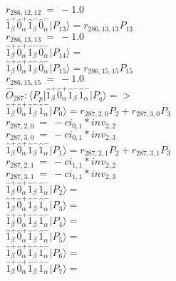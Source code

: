 \documentclass[14pt]{article}
\begin{document}
    ${r}_{286,12,12}\ =\ -1.0 $ \\ 
    $ \hat{1}_{\beta}^{+}\hat{0}_{\alpha}^{+}\hat{1}_{\beta}^{-}\hat{0}_{\alpha}^{-} \vert{P_{13}}\rangle = {r}_{286,13,13}P_{13} $ \\ 
    ${r}_{286,13,13}\ =\ -1.0 $ \\ 
    $ \hat{1}_{\beta}^{+}\hat{0}_{\alpha}^{+}\hat{1}_{\beta}^{-}\hat{0}_{\alpha}^{-} \vert{P_{14}}\rangle =  $ \\ 
    $ \hat{1}_{\beta}^{+}\hat{0}_{\alpha}^{+}\hat{1}_{\beta}^{-}\hat{0}_{\alpha}^{-} \vert{P_{15}}\rangle = {r}_{286,15,15}P_{15} $ \\ 
    ${r}_{286,15,15}\ =\ -1.0 $ \\ 
    
    $\hat{O}_{287}:  \langle{P_p}\vert \hat{1}_{\beta}^{+}\hat{0}_{\alpha}^{+}\hat{1}_{\beta}^{-}\hat{1}_{\alpha}^{-} \vert{P_q}\rangle => $ \\ 
    $ \hat{1}_{\beta}^{+}\hat{0}_{\alpha}^{+}\hat{1}_{\beta}^{-}\hat{1}_{\alpha}^{-} \vert{P_{0}}\rangle = {r}_{287,2,0}P_{2}+{r}_{287,3,0}P_{3} $ \\ 
    ${r}_{287,2,0}\ =\ -{ci}_{0,1}*{inv}_{2,2} $ \\ 
    ${r}_{287,3,0}\ =\ -{ci}_{0,1}*{inv}_{2,3} $ \\ 
    $ \hat{1}_{\beta}^{+}\hat{0}_{\alpha}^{+}\hat{1}_{\beta}^{-}\hat{1}_{\alpha}^{-} \vert{P_{1}}\rangle = {r}_{287,2,1}P_{2}+{r}_{287,3,1}P_{3} $ \\ 
    ${r}_{287,2,1}\ =\ -{ci}_{1,1}*{inv}_{2,2} $ \\ 
    ${r}_{287,3,1}\ =\ -{ci}_{1,1}*{inv}_{2,3} $ \\ 
    $ \hat{1}_{\beta}^{+}\hat{0}_{\alpha}^{+}\hat{1}_{\beta}^{-}\hat{1}_{\alpha}^{-} \vert{P_{2}}\rangle =  $ \\ 
    $ \hat{1}_{\beta}^{+}\hat{0}_{\alpha}^{+}\hat{1}_{\beta}^{-}\hat{1}_{\alpha}^{-} \vert{P_{3}}\rangle =  $ \\ 
    $ \hat{1}_{\beta}^{+}\hat{0}_{\alpha}^{+}\hat{1}_{\beta}^{-}\hat{1}_{\alpha}^{-} \vert{P_{4}}\rangle =  $ \\ 
    $ \hat{1}_{\beta}^{+}\hat{0}_{\alpha}^{+}\hat{1}_{\beta}^{-}\hat{1}_{\alpha}^{-} \vert{P_{5}}\rangle =  $ \\ 
    $ \hat{1}_{\beta}^{+}\hat{0}_{\alpha}^{+}\hat{1}_{\beta}^{-}\hat{1}_{\alpha}^{-} \vert{P_{6}}\rangle =  $ \\ 
    $ \hat{1}_{\beta}^{+}\hat{0}_{\alpha}^{+}\hat{1}_{\beta}^{-}\hat{1}_{\alpha}^{-} \vert{P_{7}}\rangle =  $ \\ 
\end{document}
